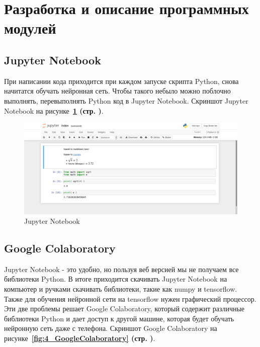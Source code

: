 \section{Разработка и описание программных модулей}



\subsection{Jupyter Notebook}

При написании кода приходится при каждом запуске скрипта Python,
снова начитатся обучать нейронная сеть.
Чтобы такого небыло можно поблочно выполнять, перевыполнять Python код в Jupyter Notebook.
Скриншот Jupyter Notebook на
рисунке~\textbf{\ref{fig:4_JupyterNotebook} (стр. \pageref{fig:4_JupyterNotebook})}.

\begin{figure}[!htbp]
    \centering
    \includegraphics[width=16cm]
    {../_INCLUDES/main/4/JupyterNotebook.png}
    \caption{Jupyter Notebook}
    \label{fig:4_JupyterNotebook}
\end{figure}



\subsection{Google Colaboratory}

Jupyter Notebook - это удобно, но пользуя веб версией мы не получаем все библиотеки Python.
В итоге приходится скачивать Jupyter Notebook на компьютер и ручками скачивать библиотеки,
такие как numpy и tensorflow. Также для обучения нейронной сети на tensorflow нужен графический процессор. Эти две проблемы решает Google Colaboratory, который содержит различные библиотеки Python и дает доступ к другой машине, которая будет обучать нейронную сеть даже с телефона.
Скриншот Google Colaboratory на
рисунке~\textbf{\ref{fig:4_GoogleColaboratory} (стр. \pageref{fig:4_GoogleColaboratory})}.

